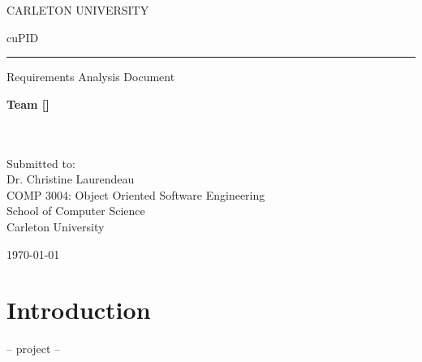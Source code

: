 \documentclass[12pt,letterpaper]{article}
\begin{document}

\thispagestyle{empty}

\begin{center}
	CARLETON UNIVERSITY
\end{center}

\vfill

\begin{center}
	{\fontsize{55pt}{55pt}\selectfont cuPID}
	\vspace{0.5em}\rule{\textwidth}{0.5pt}
	Requirements Analysis Document
\end{center}

\vspace{5em}

\begin{center}
	\textbf{Team [\teamname{}]}\\
	\personone{}\\
	\persontwo{}\\
	\personthree{}
\end{center}

\vfill

\begin{center}
	Submitted to:\\
	Dr. Christine Laurendeau\\
	COMP 3004: Object Oriented Software Engineering\\
	School of Computer Science\\
	Carleton University
\end{center}

\vspace{2em}

\begin{center}
	\today
\end{center}

\newpage{}

\tableofcontents{}

\renewcommand{\listfigurename}{Figures}
\listoffigures

\renewcommand{\listtablename}{Tables}
\listoftables

\newpage{}

\section{Introduction}

\begin{center}
    -- project --
\end{center}
\end{document}
